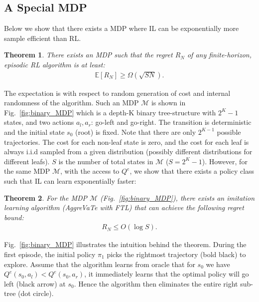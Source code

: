 \documentclass{article}
\newtheorem{theorem}{Theorem}[section]
\begin{document}
\subsection{A Special MDP}
\label{sec:special_mdp}
Below we show that there exists a MDP where IL can be exponentially more sample efficient than RL.
\begin{theorem}
\label{them:special_lower}
There exists an MDP such that the regret $R_N$ of any finite-horizon, episodic RL algorithm is at least:
\begin{align}
\mathbb{E}[R_N] \geq \Omega(\sqrt{SN}).
\end{align} 
\end{theorem} The expectation is with respect to random generation of cost and internal randomness of the algorithm. Such an MDP $\mathcal{M}$ is shown in Fig.~\ref{fig:binary_MDP} which is a depth-K binary tree-structure with $2^K-1$ states, and two actions ${a_l, a_r}$:  go-left and go-right. The transition is deterministic and the initial state $s_0$ (root) is fixed. Note that there are only $2^{K-1}$ possible trajectories. The cost for each non-leaf state is zero, and the cost for each leaf is always i.i.d sampled from a given distribution (possibly different distributions for different leafs).  $S$ is the number of total states in ${\mathcal{M}}$ ($S = 2^K-1$). However, for the same MDP $\mathcal{M}$, with the access to $Q^e$, we show that there exists a policy class such that IL can learn exponentially faster:%
\begin{theorem}
\label{them:special_upper}
For the MDP ${\mathcal{M}}$ (Fig.~\ref{fig:binary_MDP}), there exists an imitation learning algorithm (AggreVaTe with FTL) that can achieve the following regret bound:
\begin{align}
R_N \leq O(\log{S}).
\end{align}
\end{theorem}
Fig.~\ref{fig:binary_MDP} illustrates the intuition behind the theorem. During the first episode, the initial policy $\pi_1$ picks the rightmost trajectory (bold black) to explore. Assume that the algorithm learns from oracle that for $s_0$ we have $Q^e(s_0,a_l)<Q^e(s_0,a_r)$, it immediately learns that the optimal policy will go left (black arrow) at $s_0$. Hence the algorithm then eliminates the entire right sub-tree (dot circle).
\end{document}

